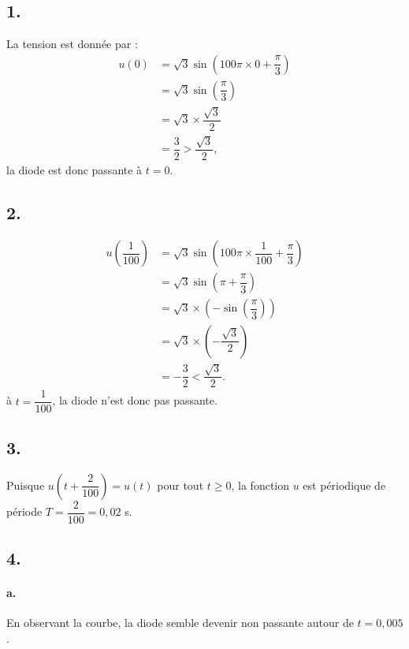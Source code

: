 \subsection*{1.}

La tension est donnée par :
\begin{align*}
u(0) &= \sqrt{3} \sin\left(100\pi \times 0 + \dfrac{\pi}{3}\right) \\
&= \sqrt{3} \sin\left(\dfrac{\pi}{3}\right) \\
&= \sqrt{3} \times \dfrac{\sqrt{3}}{2} \\
&= \dfrac{3}{2} > \dfrac{\sqrt{3}}{2},
\end{align*}
la diode est donc passante à \( t = 0 \).

\subsection*{2.}

\begin{align*}
u\left(\dfrac{1}{100}\right) &= \sqrt{3} \sin\left(100\pi \times \dfrac{1}{100} + \dfrac{\pi}{3}\right) \\
&= \sqrt{3} \sin\left(\pi + \dfrac{\pi}{3}\right) \\
&= \sqrt{3} \times \left(-\sin \left(\dfrac{\pi}{3}\right)\right) \\
&= \sqrt{3} \times \left(- \dfrac{\sqrt{3}}{2}\right) \\
&= - \dfrac{3}{2} < \dfrac{\sqrt{3}}{2}.
\end{align*}
à \( t = \dfrac{1}{100} \), la diode n'est donc pas passante.

\subsection*{3.}

Puisque \( u\left(t + \dfrac{2}{100}\right) = u(t) \) pour tout \( t \geqslant 0 \), la fonction \( u \) est périodique de période \( T = \dfrac{2}{100} = 0{,}02 \) s.

\subsection*{4.}

\paragraph{a.} En observant la courbe, la diode semble devenir non passante autour de \( t = 0{,}005 \).

